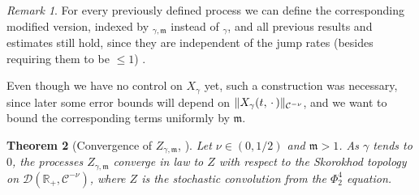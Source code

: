 \documentclass{report}
\newcommand{\RR}{\mathbb{R}}
\DeclarePairedDelimiter\norm{\lVert}{\rVert}%
\newcommand{\Placeholder}{\,\mathrel{\cdot}\,}
\newtheorem{theorem}{Theorem}[chapter]
\theoremstyle{remark}
\newtheorem{remark}[theorem]{Remark}
\theoremstyle{definition}
\begin{document}
\begin{remark}
  \label{remark:all_previous_results_hold}
  For every previously defined process we can define the corresponding modified version, indexed by $_{\gamma, \mathfrak{m}}$ instead of $_\gamma$, and all previous results and estimates still hold, since they are independent of the jump rates (besides requiring them to be $\le 1$) \cite[p39]{mourrat2015convergencetwodimensionaldynamicisingkac}.
\end{remark}

Even though we have no control on $X_\gamma$ yet, such a construction was necessary, since later some error bounds will depend on $\norm{X_\gamma(t, \Placeholder)}_{\mathcal{C}^{-\nu}}$, and we want to bound the corresponding terms uniformly by $\mathfrak{m}$.

\begin{theorem}[Convergence of $Z_{\gamma,\mathfrak{m}}$, {\cite[Theorem 6.1]{mourrat2015convergencetwodimensionaldynamicisingkac}}]
  Let $\nu \in (0, 1/2)$ and $\mathfrak{m} > 1$. As $\gamma$ tends to $0$, the processes $Z_{\gamma, \mathfrak{m}}$ converge in law to $Z$ with respect to the Skorokhod topology on $\mathcal{D}(\RR_+, \mathcal{C}^{-\nu})$, where $Z$ is the stochastic convolution from the $\Phi^4_2$ equation.
\end{theorem}
\end{document}
